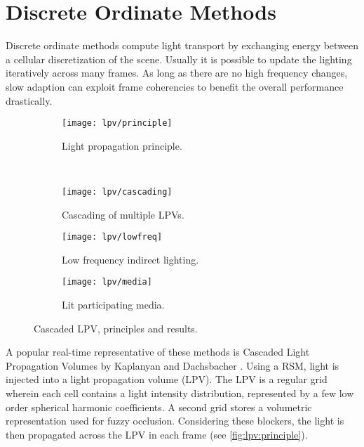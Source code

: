 \documentclass[thesis.tex]{subfiles}
\begin{document}
\section{Discrete Ordinate Methods}
Discrete ordinate methods compute light transport by exchanging energy between a cellular discretization of the scene.
Usually it is possible to update the lighting iteratively across many frames.
As long as there are no high frequency changes, slow adaption can exploit frame coherencies to benefit the overall performance drastically.

\begin{figure}[h]
\centering
\begin{subfigure}[b]{0.35\textwidth}
\centering
\texttt{[image: lpv/principle]}
\caption{Light propagation principle.}
\label{fig:lpv:principle}
\end{subfigure}
~~~~
\begin{subfigure}[b]{0.53\textwidth}
\centering
\texttt{[image: lpv/cascading]}
\caption{Cascading of multiple LPVs.}
\label{fig:lpv:cascading}
\end{subfigure}

\vspace{0.3cm}

\begin{subfigure}[b]{0.48\textwidth}
\centering
\texttt{[image: lpv/lowfreq]}
\caption{Low frequency indirect lighting.}
\label{fig:lpv:results}
\end{subfigure}
\begin{subfigure}[b]{0.48\textwidth}
\centering
\texttt{[image: lpv/media]}
\caption{Lit participating media.}
\end{subfigure}
\caption{\cite{bib:lpt} Cascaded LPV, principles and results.}
\end{figure}
A popular real-time representative of these methods is Cascaded Light Propagation Volumes by Kaplanyan and Dachsbacher \cite{bib:lpt}.
Using a RSM, light is injected into a light propagation volume (LPV).
The LPV is a regular grid wherein each cell contains a light intensity distribution, represented by a few low order spherical harmonic coefficients.
A second grid stores a volumetric representation used for fuzzy occlusion.
Considering these blockers, the light is then propagated across the LPV in each frame (see \autoref{fig:lpv:principle}).
\end{document}

